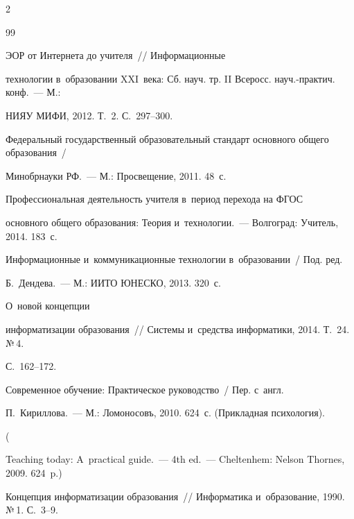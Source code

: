 \begin{multicols}{2}
{\small\frenchspacing


 {%




 \begin{thebibliography}{99}




 ЭОР от Интернета до учителя~// Информационные


технологии в~образовании XXI~века: Сб. науч. тр. II Всеросс. науч.-практич. конф.~--- М.:


НИЯУ МИФИ, 2012. Т.~2. С.~297--300.




Федеральный государственный образовательный стандарт основного общего образования~/


Минобрнауки РФ.~--- М.: Просвещение, 2011. 48~с. %




 Профессиональная деятельность учителя в~период перехода на ФГОС


основного общего образования: Теория и~технологии.~--- Волгоград: Учитель, 2014. 183~с.




Информационные и~коммуникационные технологии в~образовании~/ Под. ред.


Б.~Дендева.~--- М.: ИИТО ЮНЕСКО, 2013. 320~с.




 О~новой концепции


информатизации образования~// Системы и~средства информатики, 2014. Т.~24. №\,4.


С.~162--172.




 Современное обучение: Практическое руководство~/ Пер. с~англ.


П.~Кириллова.~--- М.: Ломоносовъ, 2010. 624~с. (Прикладная психология).


(


Teaching today: A~practical guide.~--- 4th ed.~--- Cheltenhem: Nelson Thornes, 2009. 624~p.)




Концепция информатизации образования~// Информатика и~образование, 1990. №\,1. С.~3--9.



\end{thebibliography}}}
\end{multicols}
